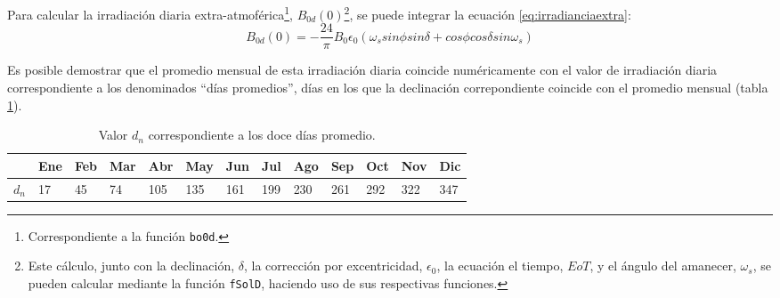 Para calcular la irradiación diaria extra-atmoférica\footnote{Correspondiente a la función \texttt{bo0d}.}, \(B_{0d}(0)\)\footnote{Este cálculo, junto con la declinación, \(\delta\), la corrección por excentricidad, \(\epsilon_0\), la ecuación el tiempo, \(EoT\), y el ángulo del amanecer, \(\omega_s\), se pueden calcular mediante la función \texttt{fSolD}, haciendo uso de sus respectivas funciones.}, se puede integrar la ecuación \ref{eq:irradianciaextra}:
\begin{equation}
B_{0d}(0)=-\frac{24}{\pi}B_0\epsilon_0(\omega_s sin\phi sin\delta + cos\phi cos\delta sin \omega_s)
\label{eq:irradiacionextra}
\end{equation}

Es posible demostrar que el promedio mensual de esta irradiación diaria coincide numéricamente con el valor de irradiación diaria correspondiente a los denominados ``días promedios'', días en los que la declinación correpondiente coincide con el promedio mensual (tabla \ref{tab:DiasPromedio}).
\begin{center}
{\footnotesize }%
\begin{table}
{\footnotesize \caption{Valor $d_{n}$ correspondiente a los doce días promedio.\label{tab:DiasPromedio}}
}{\footnotesize \par}

\centering{}{\footnotesize }\begin{tabular}{>{\centering}p{6mm}>{\centering}m{4mm}>{\centering}m{4mm}>{\centering}m{4mm}>{\centering}m{4mm}>{\centering}m{4mm}>{\centering}m{4mm}>{\centering}m{4mm}>{\centering}m{4mm}>{\centering}m{4mm}>{\centering}m{4mm}>{\centering}m{4mm}>{\centering}m{3mm}}
\toprule 
{\footnotesize Mes} & {\footnotesize Ene} & {\footnotesize Feb} & {\footnotesize Mar} & {\footnotesize Abr} & {\footnotesize May} & {\footnotesize Jun} & {\footnotesize Jul} & {\footnotesize Ago} & {\footnotesize Sep} & {\footnotesize Oct} & {\footnotesize Nov} & {\footnotesize Dic}\tabularnewline
\midrule
$d_{n}$ & {\footnotesize 17} & {\footnotesize 45} & {\footnotesize 74} & {\footnotesize 105} & {\footnotesize 135} & {\footnotesize 161} & {\footnotesize 199} & {\footnotesize 230} & {\footnotesize 261} & {\footnotesize 292} & {\footnotesize 322} & {\footnotesize 347}\tabularnewline
\bottomrule
\end{tabular}
\end{table}
\par\end{center}{\footnotesize \par}

